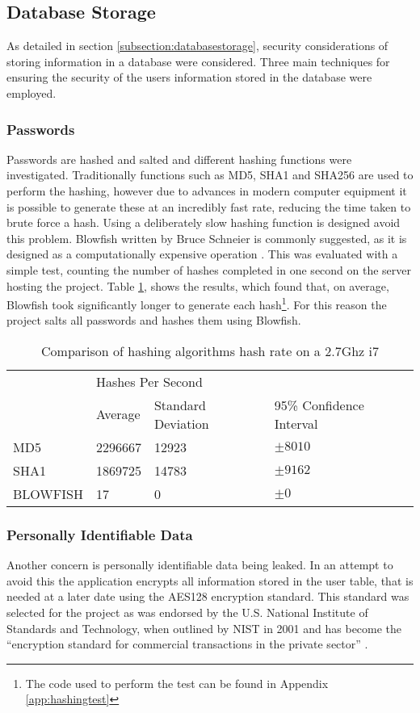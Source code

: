 \subsection{Database Storage}
As detailed in section \ref{subsection:databasestorage}, security considerations of storing information in a database were considered. Three main techniques for ensuring the security of the users information stored in the database were employed.

\subsubsection{Passwords}
Passwords are hashed and salted and different hashing functions were investigated. Traditionally functions such as MD5, SHA1 and SHA256 are used to perform the hashing, however due to advances in modern computer equipment it is possible to generate these at an incredibly fast rate, reducing the time taken to brute force a hash.
%
Using a deliberately slow hashing function is designed avoid this problem. Blowfish written by Bruce Schneier is commonly suggested, as it is designed as a computationally expensive operation \parencite{schneier1994description} . This was evaluated with a simple test, counting the number of hashes completed in one second on the server hosting the project. Table \ref{tab:hashingspeed}, shows the results, which found that, on average, Blowfish took significantly longer to generate each hash\footnote{The code used to perform the test can be found in Appendix \ref{app:hashingtest}}.
%
For this reason the project salts all passwords and hashes them using Blowfish.

\begin{table}[h]
\begin{tabular}{llll}
         & \multicolumn{3}{l}{Hashes Per Second}                   \\
         & Average & Standard Deviation & 95\% Confidence Interval \\
MD5      & \num{2296667} & \num{12923}  & $\pm 8010$   \\
SHA1     & \num{1869725} & \num{14783}  & $\pm 9162$    \\
BLOWFISH & 17            & 0            & $\pm 0$                 \\
\end{tabular}
\caption{Comparison of hashing algorithms hash rate on a 2.7Ghz i7}
\label{tab:hashingspeed}
\end{table}

\subsubsection{Personally Identifiable Data}
Another concern is personally identifiable data being leaked. In an attempt to avoid this the application encrypts all information stored in the user table, that is needed at a later date using the AES128 encryption standard. This standard was selected for the project as was endorsed by the U.S. National Institute of Standards and Technology, when outlined by NIST in 2001 and has become the ``encryption standard for commercial transactions in the private sector'' \cite{nist2010aes, stair2009informationsystems}.


